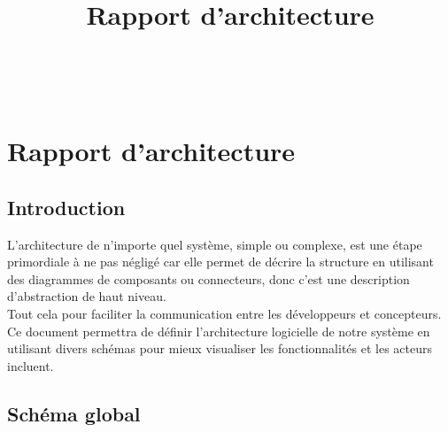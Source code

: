 \documentclass[11pt,fleqn]{book} %
\begin{document}
\title{Rapport d'architecture}

\begingroup
{}
\endgroup


\newpage
~\vfill
\thispagestyle{empty}




\pagestyle{empty} %

\tableofcontents %


\pagestyle{fancy} %


\chapter{Rapport d'architecture}
\section{Introduction}
L’architecture de n’importe quel système, simple ou complexe, est une étape primordiale à ne pas négligé car elle permet de décrire la structure en utilisant des 
diagrammes de composants ou connecteurs, donc c’est une description d’abstraction 
de haut niveau.\\
Tout cela pour faciliter la communication entre les développeurs et concepteurs.\\
Ce document permettra de définir l’architecture logicielle de notre système en utilisant divers schémas pour mieux visualiser les fonctionnalités et les acteurs incluent.
\section{Schéma global}
\end{document}
